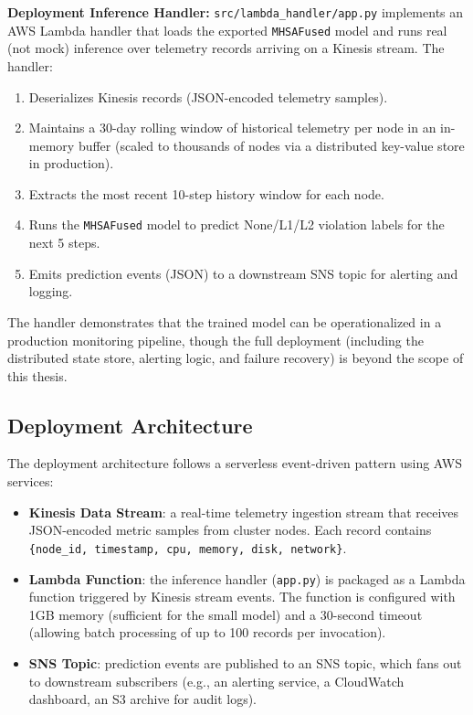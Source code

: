 \textbf{Deployment Inference Handler:} \texttt{src/lambda\_handler/app.py} implements an AWS Lambda handler that loads the exported \texttt{MHSAFused} model and runs real (not mock) inference over telemetry records arriving on a Kinesis stream. The handler:
\begin{enumerate}
  \item Deserializes Kinesis records (JSON-encoded telemetry samples).
  \item Maintains a 30-day rolling window of historical telemetry per node in an in-memory buffer (scaled to thousands of nodes via a distributed key-value store in production).
  \item Extracts the most recent 10-step history window for each node.
  \item Runs the \texttt{MHSAFused} model to predict None/L1/L2 violation labels for the next 5 steps.
  \item Emits prediction events (JSON) to a downstream SNS topic for alerting and logging.
\end{enumerate}

The handler demonstrates that the trained model can be operationalized in a production monitoring pipeline, though the full deployment (including the distributed state store, alerting logic, and failure recovery) is beyond the scope of this thesis.

\subsection{Deployment Architecture}
\label{subsec:deployment}

The deployment architecture follows a serverless event-driven pattern using AWS services:

\begin{itemize}
  \item \textbf{Kinesis Data Stream}: a real-time telemetry ingestion stream that receives JSON-encoded metric samples from cluster nodes. Each record contains \texttt{\{node\_id, timestamp, cpu, memory, disk, network\}}.
  \item \textbf{Lambda Function}: the inference handler (\texttt{app.py}) is packaged as a Lambda function triggered by Kinesis stream events. The function is configured with 1GB memory (sufficient for the small model) and a 30-second timeout (allowing batch processing of up to 100 records per invocation).
  \item \textbf{SNS Topic}: prediction events are published to an SNS topic, which fans out to downstream subscribers (e.g., an alerting service, a CloudWatch dashboard, an S3 archive for audit logs).
\end{itemize}

